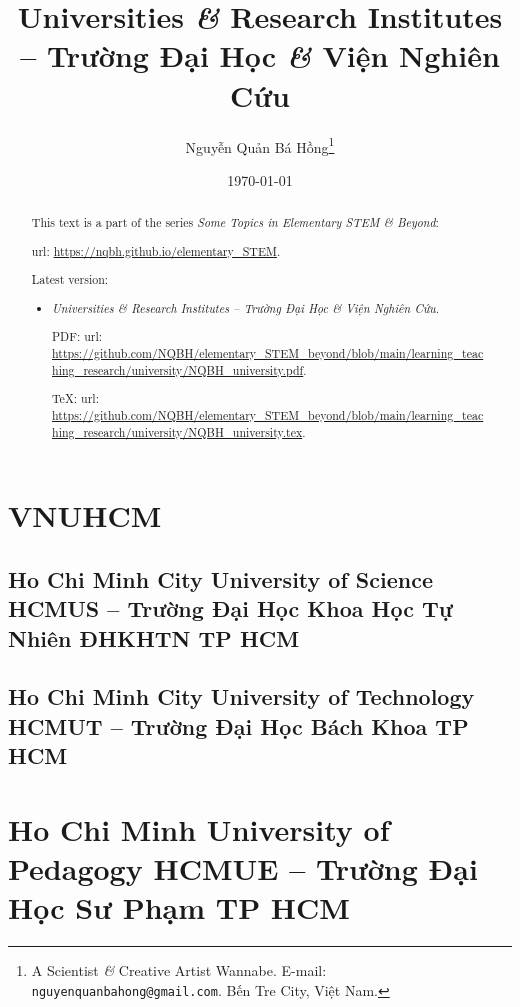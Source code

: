 \documentclass{article}
\title{Universities {\it\&} Research Institutes -- Trường Đại Học {\it\&} Viện Nghiên Cứu}
\author{Nguyễn Quản Bá Hồng\footnote{A Scientist {\it\&} Creative Artist Wannabe. E-mail: {\tt nguyenquanbahong@gmail.com}. Bến Tre City, Việt Nam.}}
\date{\today}
\begin{document}
\maketitle
\begin{abstract}
	This text is a part of the series {\it Some Topics in Elementary STEM \& Beyond}:
	
	{\sc url}: \url{https://nqbh.github.io/elementary_STEM}.
	
	Latest version:
	\begin{itemize}
		\item {\it Universities \& Research Institutes -- Trường Đại Học \& Viện Nghiên Cứu}.
		
		PDF: {\sc url}: \url{https://github.com/NQBH/elementary_STEM_beyond/blob/main/learning_teaching_research/university/NQBH_university.pdf}.
		
		\TeX: {\sc url}: \url{https://github.com/NQBH/elementary_STEM_beyond/blob/main/learning_teaching_research/university/NQBH_university.tex}.
	\end{itemize}
\end{abstract}
\tableofcontents


\section{VNUHCM}

\subsection{Ho Chi Minh City University of Science HCMUS -- Trường Đại Học Khoa Học Tự Nhiên ĐHKHTN TP HCM}


\subsection{Ho Chi Minh City University of Technology HCMUT -- Trường Đại Học Bách Khoa TP HCM}


\section{Ho Chi Minh University of Pedagogy HCMUE -- Trường Đại Học Sư Phạm TP HCM}
\end{document}
